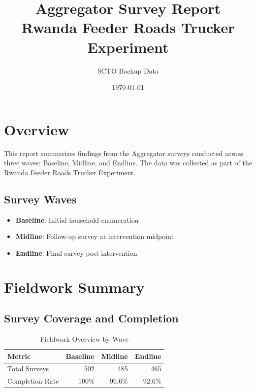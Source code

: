 \documentclass[11pt]{article}
\title{\Large \textbf{Aggregator Survey Report}\\
Rwanda Feeder Roads Trucker Experiment}
\author{SCTO Backup Data}
\date{\today}
\begin{document}
\maketitle

\tableofcontents
\newpage

\section{Overview}

This report summarizes findings from the Aggregator surveys conducted across three waves: Baseline, Midline, and Endline. The data was collected as part of the Rwanda Feeder Roads Trucker Experiment.

\subsection{Survey Waves}
\begin{itemize}
    \item \textbf{Baseline}: Initial household enumeration
    \item \textbf{Midline}: Follow-up survey at intervention midpoint
    \item \textbf{Endline}: Final survey post-intervention
\end{itemize}

\section{Fieldwork Summary}

\subsection{Survey Coverage and Completion}

\begin{table}[h!]
\centering
\caption{Fieldwork Overview by Wave}
\label{tab:fieldwork}
\begin{tabularx}{0.8\textwidth}{lrrr}
\toprule
\textbf{Metric} & \textbf{Baseline} & \textbf{Midline} & \textbf{Endline} \\
\midrule
Total Surveys & 502 & 485 & 465 \\
Completion Rate & 100\% & 96.6\% & 92.6\% \\
\bottomrule
\end{tabularx}
\end{table}
\end{document}
